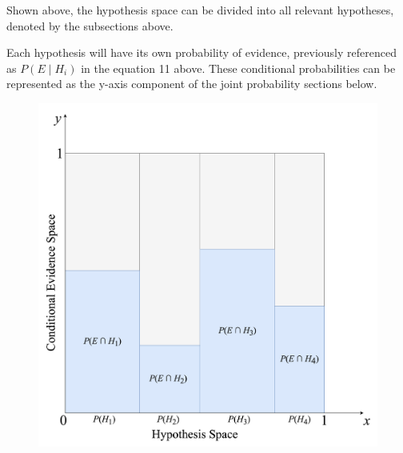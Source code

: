 \documentclass[12pt]{article}
\begin{document}
\noindent Shown above, the hypothesis space can be divided into all relevant hypotheses, denoted by the subsections above.

\newpage

\noindent Each hypothesis will have its own probability of evidence, previously referenced as $P(E \mid H_i)$ in the equation 11 above. These conditional probabilities can be represented as the y-axis component of the joint probability sections below.

\begin{figure}[h!]
    \centering
    \begin{minipage}{0.72\textwidth}
        \centering
        \includegraphics[width=\textwidth]{assets/visual_5.png}
    \end{minipage}\hfill
    \begin{minipage}{0.28\textwidth}
        \centering

\end{minipage}
\end{figure}
\end{document}
